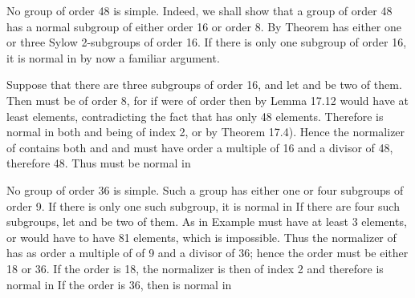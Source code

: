 \documentclass[11pt,oneside]{article}
\begin{document}
\begin{BookBody}
 No group of order 48 is simple. Indeed, we shall show that a group  of order 48 has a normal subgroup of either order 16 or order 8. By Theorem  has either one or three Sylow 2-subgroups of order 16. If there is only one subgroup of order 16, it is normal in  by now a familiar argument.

Suppose that there are three subgroups of order 16, and let  and  be two of them. Then  must be of order 8, for if  were of order  then by Lemma 17.12  would have at least  elements, contradicting the fact that  has only 48 elements. Therefore is normal in both  and being of index 2, or by Theorem 17.4). Hence the normalizer of  contains both  and  and must have order a multiple  of 16 and a divisor of 48, therefore 48. Thus  must be normal in \BookEnd{\blacktriangle}

 No group of order 36 is simple. Such a group  has either one or four subgroups of order 9. If there is only one such subgroup, it is normal in  If there are four such subgroups, let  and  be two of them. As in Example  must have at least 3 elements, or  would have to have 81 elements, which is impossible. Thus the normalizer of  has as order a multiple of  of 9 and a divisor of 36; hence the order must be either 18 or 36. If the order is 18, the normalizer is then of index 2 and therefore is normal in  If the order is 36, then  is normal in \BookEnd{\blacktriangle}


\end{BookBody}
\end{document}
